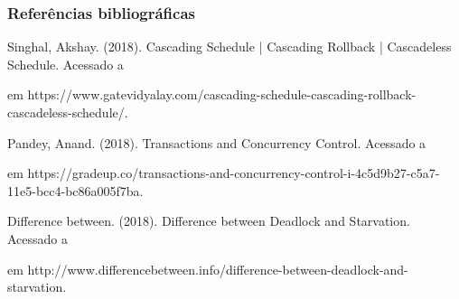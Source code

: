 \documentclass{beamer}
\begin{document}
\begin{frame} %
    \frametitle{Referências bibliográficas}
    \footnotesize{
    \begin{thebibliography}{99} %

        Singhal, Akshay. (2018). Cascading Schedule | Cascading Rollback | Cascadeless Schedule. Acessado a \date{25/11/2018} em https://www.gatevidyalay.com/cascading-schedule-cascading-rollback-cascadeless-schedule/.

        Pandey, Anand. (2018). Transactions and Concurrency Control. Acessado a \date{25/11/2018} em https://gradeup.co/transactions-and-concurrency-control-i-4c5d9b27-c5a7-11e5-bcc4-bc86a005f7ba.

        Difference between. (2018). Difference between Deadlock and Starvation. Acessado a \date{25/11/2018} em http://www.differencebetween.info/difference-between-deadlock-and-starvation.

    \end{thebibliography}
    }
\end{frame}

\end{document}
